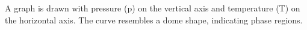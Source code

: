 A graph is drawn with pressure (p) on the vertical axis and temperature (T) on the horizontal axis. The curve resembles a dome shape, indicating phase regions.